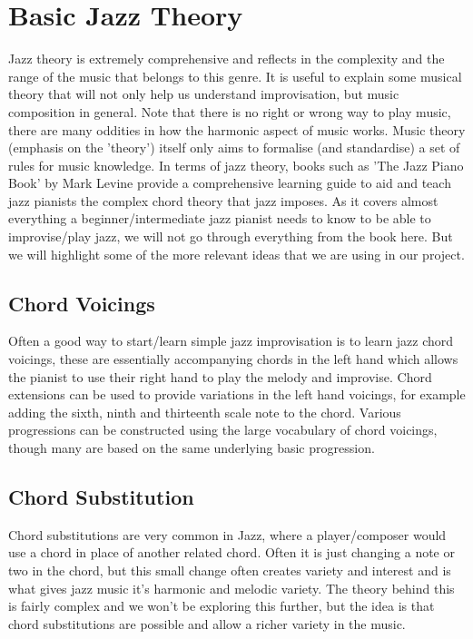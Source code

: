 \documentclass[pdftex,12pt,a4paper]{report}
\begin{document}
\section{Basic Jazz Theory}
Jazz theory is extremely comprehensive and reflects in the complexity and the range of the music that belongs to this genre. It is useful to explain some musical theory that will not only help us understand improvisation, but music composition in general. Note that there is no right or wrong way to play music, there are many oddities in how the harmonic aspect of music works. Music theory (emphasis on the 'theory') itself only aims to formalise (and standardise) a set of rules for music knowledge. In terms of jazz theory, books such as 'The Jazz Piano Book' by Mark Levine provide a comprehensive learning guide to aid and teach jazz pianists the complex chord theory that jazz imposes. As it covers almost everything a beginner/intermediate jazz pianist needs to know to be able to improvise/play jazz, we will not go through everything from the book here. But we will highlight some of the more relevant ideas that we are using in our project.

\subsection{Chord Voicings}
Often a good way to start/learn simple jazz improvisation is to learn jazz chord voicings, these are essentially accompanying chords in the left hand which allows the pianist to use their right hand to play the melody and improvise. Chord extensions can be used to provide variations in the left hand voicings, for example adding the sixth, ninth and thirteenth scale note to the chord. Various progressions can be constructed using the large vocabulary of chord voicings, though many are based on the same underlying basic progression.

\subsection{Chord Substitution}
Chord substitutions are very common in Jazz, where a player/composer would use a chord in place of another related chord. Often it is just changing a note or two in the chord, but this small change often creates variety and interest and is what gives jazz music it's harmonic and melodic variety. The theory behind this is fairly complex and we won't be exploring this further, but the idea is that chord substitutions are possible and allow a richer variety in the music.
\end{document}
